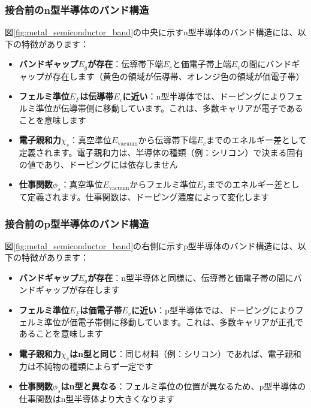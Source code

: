 \subsubsection{接合前のn型半導体のバンド構造}

図\ref{fig:metal_semiconductor_band}の中央に示すn型半導体のバンド構造には、以下の特徴があります：

\begin{itemize}
\item \textbf{バンドギャップ$E_g$が存在}：伝導帯下端$E_c$と価電子帯上端$E_v$の間にバンドギャップが存在します（黄色の領域が伝導帯、オレンジ色の領域が価電子帯）

\item \textbf{フェルミ準位$E_F$は伝導帯$E_c$に近い}：n型半導体では、ドーピングによりフェルミ準位が伝導帯側に移動しています。これは、多数キャリアが電子であることを意味します

\item \textbf{電子親和力$\chi_s$}：真空準位$E_{\text{vacuum}}$から伝導帯下端$E_c$までのエネルギー差として定義されます。電子親和力は、半導体の種類（例：シリコン）で決まる固有の値であり、ドーピングには依存しません

\item \textbf{仕事関数$\phi_s$}：真空準位$E_{\text{vacuum}}$からフェルミ準位$E_F$までのエネルギー差として定義されます。仕事関数は、ドーピング濃度によって変化します
\end{itemize}

\subsubsection{接合前のp型半導体のバンド構造}

図\ref{fig:metal_semiconductor_band}の右側に示すp型半導体のバンド構造には、以下の特徴があります：

\begin{itemize}
\item \textbf{バンドギャップ$E_g$が存在}：n型半導体と同様に、伝導帯と価電子帯の間にバンドギャップが存在します

\item \textbf{フェルミ準位$E_F$は価電子帯$E_v$に近い}：p型半導体では、ドーピングによりフェルミ準位が価電子帯側に移動しています。これは、多数キャリアが正孔であることを意味します

\item \textbf{電子親和力$\chi_s$はn型と同じ}：同じ材料（例：シリコン）であれば、電子親和力は不純物の種類によらず一定です

\item \textbf{仕事関数$\phi_s$はn型と異なる}：フェルミ準位の位置が異なるため、p型半導体の仕事関数はn型半導体より大きくなります
\end{itemize}

